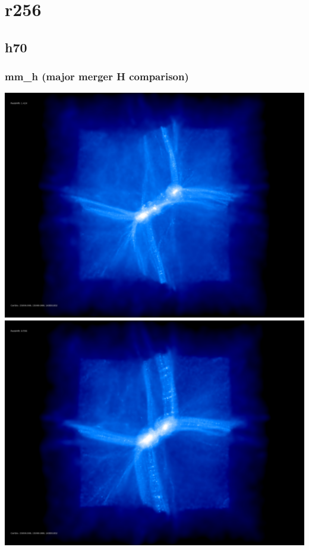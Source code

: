 
\section{r256} 

\subsection{h70}

\subsubsection{mm\_h (major merger H comparison)}
\includegraphics[scale=0.1]{r256/h70/mm_h/50.jpg} 
\includegraphics[scale=0.1]{r256/h70/mm_h/100.jpg} \\

